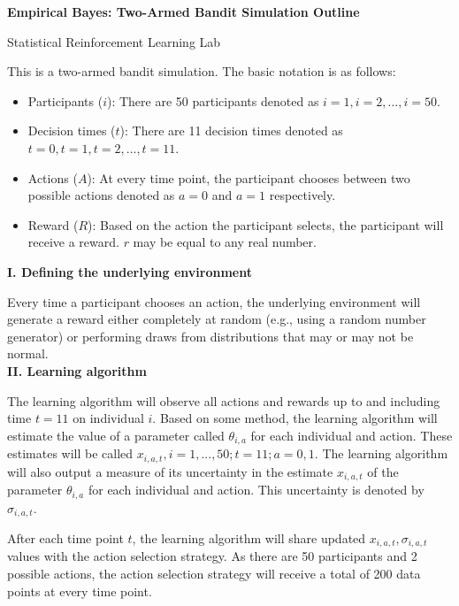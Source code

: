 \documentclass[letterpaper, 11pt]{extarticle}
\begin{document}
\begin{Large}
    \textsf{\textbf{Empirical Bayes: Two-Armed Bandit Simulation Outline}}   \par
    Statistical Reinforcement Learning Lab
\end{Large}

\vspace{2ex}

This is a two-armed bandit simulation. The basic notation is as follows: 
\begin{itemize}
    \item Participants ($i$): There are 50 participants denoted as $i=1, i=2, \dots, i=50$.
    \item Decision times ($t$): There are 11 decision times denoted as $t=0, t=1, t=2,\dots,t=11$. 
    \item Actions ($A$): At every time point, the participant chooses between two possible actions denoted as $a=0$ and $a=1$ respectively. 
    \item Reward ($R$): Based on the action the participant selects, the participant will receive a reward. $r$ may be equal to any real number. 
\end{itemize}

\textsf{\textbf {I. Defining the underlying environment}}

Every time a participant chooses an action, the underlying environment will generate a reward either completely at random (e.g., using a random number generator) or performing draws from distributions that may or may not be normal. \\

\textsf{\textbf {II. Learning algorithm}}

The learning algorithm will observe all  actions and rewards  up to and including time $t=11$ on individual $i$. Based on some method, the learning algorithm will estimate the value of a parameter called $\theta_{i,a}$ for each individual and action. These estimates will be called $x_{i,a,t}, i=1,...,50; t=11; a=0,1$.
The learning algorithm will also output a measure of its uncertainty in the estimate $x_{i,a,t}$ of the parameter $\theta_{i,a}$ for each individual and action.  This uncertainty is denoted by $\sigma_{i,a,t}$.

After each time point $t$, the learning algorithm will share updated $x_{i,a,t}, \sigma_{i,a,t}$ values with the action selection strategy. As there are 50 participants and 2 possible actions, the action selection strategy will receive a total of 200 data points at every time point.  \\
\end{document}
